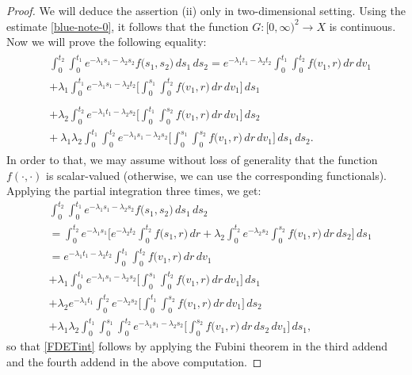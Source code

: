 \documentclass{amsart}
\theoremstyle{definition}
\theoremstyle{remark}
\numberwithin{equation}{section}
\begin{document}
\begin{proof}
We will deduce the assertion (ii) only in two-dimensional setting. Using the estimate \eqref{blue-note-0}, it follows that the function $G: [0,\infty)^{2}\rightarrow X$ is continuous. Now we will prove the following equality:
{\small
\begin{align}\label{FDETint}
\begin{split}
& \int^{t_{2}}_{0}\int^{t_{1}}_{0}e^{-\lambda_{1}s_{1}-\lambda_{2}s_{2}}f\bigl( s_{1},s_{2}\bigr)\, ds_{1}\, ds_{2}
=e^{-\lambda_{1}t_{1}-\lambda_{2}t_{2}}\int^{t_{1}}_{0}\int^{t_{2}}_{0}f\bigl( v_{1},r\bigr)\, dr\, dv_{1} 
\\& + \lambda_{1}\int^{t_{1}}_{0}e^{-\lambda_{1}s_{1}-\lambda_{2}t_{2}}\Biggl[ \int^{s_{1}}_{0}\int^{t_{2}}_{0}f\bigl( v_{1},r\bigr)\, dr\, dv_{1} \Biggr] \, ds_{1}\\
& \\& +\lambda_{2}\int^{t_{2}}_{0}e^{-\lambda_{1}t_{1}-\lambda_{2}s_{2}}\Biggl[ \int^{t_{1}}_{0}\int^{s_{2}}_{0}f\bigl( v_{1},r\bigr)\, dr \, dv_{1}\Biggr]\, ds_{2}
\\& +\ \lambda_{1} \lambda_{2}\int^{t_{1}}_{0}\int^{t_{2}}_{0}e^{-\lambda_{1}s_{1}-\lambda_{2}s_{2}}
\Biggl[ \int^{s_{1}}_{0}\int^{s_{2}}_{0}f\bigl( v_{1},r\bigr)\, dr\, dv_{1}\Biggr]\, ds_{1}\, ds_{2}.
\end{split}
\end{align}}
In order to that, we may assume without loss of generality that the function $f(\cdot,\cdot)$ is scalar-valued (otherwise, we can use the corresponding functionals). Applying the partial integration three times, we get:
\begin{align*}
& \int^{t_{2}}_{0}\int^{t_{1}}_{0}e^{-\lambda_{1}s_{1}-\lambda_{2}s_{2}}f\bigl( s_{1},s_{2}\bigr)\, ds_{1}\, ds_{2}
\\& = \int^{t_{2}}_{0}e^{-\lambda_{1}s_{1}}\Biggl[ e^{-\lambda_{2}t_{2}}\int^{t_{2}}_{0}f\bigl( s_{1},r\bigr)\, dr  +\lambda_{2}\int^{t_{2}}_{0}e^{-\lambda_{2}s_{2}}\int^{s_{2}}_{0}f\bigl( v_{1},r\bigr)\, dr \, ds_{2}\Biggr] \, ds_{1}
\\& =e^{-\lambda_{1}t_{1}-\lambda_{2}t_{2}}\int^{t_{1}}_{0}\int^{t_{2}}_{0}f\bigl( v_{1},r\bigr)\, dr\, dv_{1}
\\& +\lambda_{1}\int^{t_{1}}_{0}e^{-\lambda_{1}s_{1}-\lambda_{2}s_{2}}\Biggl[ \int^{s_{1}}_{0}\int^{t_{2}}_{0}f\bigl( v_{1},r\bigr)\, dr\, dv_{1} \Biggr]\, ds_{1} 
\\& +\lambda_{2}e^{-\lambda_{1}t_{1}}\int^{t_{2}}_{0} e^{-\lambda_{2}s_{2}} \Biggl[ \int^{t_{1}}_{0}\int^{s_{2}}_{0}f\bigl( v_{1},r\bigr)\, dr\, dv_{1}  \Biggr]  \, ds_{2}
\\& +\lambda_{1}\lambda_{2}\int^{t_{1}}_{0}\int^{s_{1}}_{0}\int^{t_{2}}_{0}e^{-\lambda_{1}s_{1}-\lambda_{2}s_{2}}
\Biggl[ \int^{s_{2}}_{0}f\bigl( v_{1},r\bigr)\, dr\, ds_{2}\, dv_{1}\Biggr]\, ds_{1},
\end{align*} 
so that \eqref{FDETint} follows by applying the Fubini theorem in the third addend and the fourth addend in the above computation. 


\end{proof}
\end{document}
